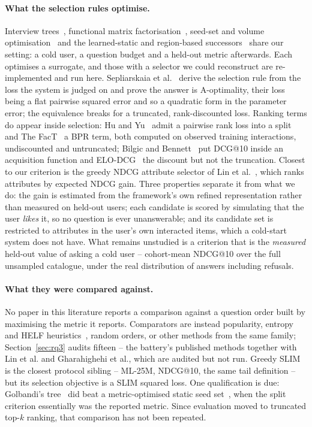 \documentclass[runningheads]{llncs}
\begin{document}
\paragraph{What the selection rules optimise.}
Interview trees~\cite{golbandi2011adaptive,hu2013interview}, functional matrix
factorisation~\cite{zhou2011functional}, seed-set and volume
optimisation~\cite{liu2011wisdom,anava2015budget} and the learned-static and region-based
successors~\cite{kweon2020deep,nguyen2024pere,parapar2021dpe} share our setting: a cold user, a
question budget and a held-out metric afterwards. Each optimises a surrogate, and those with a
selector we could reconstruct are re-implemented and run here. Sepliarskaia et al.~\cite{sepliarskaia2018spq} derive the selection rule
from the loss the system is judged on and prove the answer is A-optimality, their loss being a flat
pairwise squared error and so a quadratic form in the parameter error; the equivalence breaks for a
truncated, rank-discounted loss. Ranking terms do appear inside selection: Hu and
Yu~\cite{hu2013interview} admit a pairwise rank loss into a split and The
FacT~\cite{tao2019fact,haque2022factcrs} a BPR term, both computed on observed training interactions,
undiscounted and untruncated; Bilgic and Bennett~\cite{bilgic2012activequery} put DCG@10 inside an
acquisition function and ELO-DCG~\cite{long2010elodcg} the discount but not the truncation.
Closest to our criterion is the greedy NDCG attribute selector of Lin et
al.~\cite{lin2023upsrec}, which ranks attributes by expected NDCG gain. Three properties separate it
from what we do: the gain is estimated from the framework's own refined representation rather than
measured on held-out users; each candidate is scored by simulating that the user \emph{likes} it, so
no question is ever unanswerable; and its candidate set is restricted to attributes in the user's own
interacted items, which a cold-start system does not have. What remains unstudied is a criterion that is the \emph{measured} held-out value of asking a cold
user -- cohort-mean NDCG@10 over the full unsampled catalogue, under the real distribution of
answers including refusals.

\paragraph{What they were compared against.}
No paper in this literature reports a comparison against a question order built by maximising the
metric it reports. Comparators are instead popularity, entropy and HELF
heuristics~\cite{rashid2002getting,rashid2008learning}, random orders, or other methods from the same
family; Section~\ref{sec:rq3} audits fifteen -- the battery's published methods together with Lin et
al. and Gharahighehi et al., which are audited but not run. Greedy SLIM~\cite{proissl2024greedyslim} is the closest
protocol sibling -- ML-25M, NDCG@10, the same tail definition -- but its selection objective is a
SLIM squared loss. One qualification is due: Golbandi's tree~\cite{golbandi2011adaptive} did beat a metric-optimised
static seed set~\cite{golbandi2010bootstrapping}, when the split criterion essentially was the
reported metric. Since evaluation moved to truncated top-$k$ ranking, that comparison has not been repeated.
\end{document}

